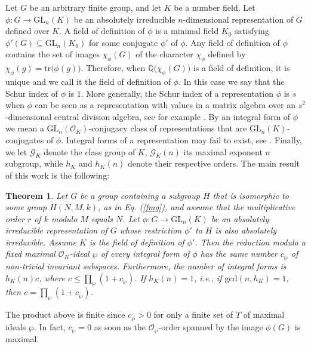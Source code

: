 \documentclass{article}
\newtheorem{theo}{Theorem}
\theoremstyle{definition}
\begin{document}
Let $G$ be an arbitrary finite group, and let $K$
be a number field. Let
$\phi:G\rightarrow\mathrm{GL}_n(K)$ be an absolutely
irreducible $n$-dimensional representation of $G$
defined over $K$. A field of definition of $\phi$ is a minimal
field $K_0$ satisfying $\phi'(G)\subseteq\mathrm{GL}_n(K_0)$ for some
conjugate $\phi'$ of $\phi$. Any field of definition of $\phi$ contains
the set of images $\chi_\phi(G)$ of the character $\chi_\phi$ defined by
$\chi_\phi(g)=\mathrm{tr}\big(\phi(g)\big)$. Therefore, when 
$\mathbb{Q}\big(\chi_\phi(G)\big)$ is a field of definition, it is unique
and we call it the field of definition of $\phi$. In this case we say that
the Schur index of $\phi$ is $1$. More generally, the Schur index of a 
representation $\phi$ is $s$ when $\phi$ can be seen as a representation with 
values in a matrix algebra over an $s^2$-dimensional central division algebra,
see for example \cite[\S2.4]{GS17}.
By an integral form of $\phi$
we mean a $\mathrm{GL}_n(\mathcal{O}_K)$-conjugacy
class of representations that are $\mathrm{GL}_n(K)$-conjugates of $\phi$. 
Integral forms of a representation may fail to exist, see \cite{Se08}.
Finally, we let $\mathcal{G}_K$ denote the class group of $K$,
$\mathcal{G}_K(n)$ its maximal exponent $n$ subgroup, while
$h_K$ and $h_K(n)$ denote their respective orders.
The main result of this work
is the following:

\begin{theo}\label{t0}
    Let $G$ be a group containing a subgroup $H$ that
    is isomorphic to some group $H(N,M,k)$, as in Eq. (\ref{fmg}),
    and assume that the multiplicative order $r$ of $k$ modulo 
    $M$ equals $N$. Let $\phi:G\rightarrow\mathrm{GL}_n(K)$ be an
    absolutely irreducible representation of $G$
    whose restriction $\phi'$ to $H$ is 
    also absolutely
    irreducible. Assume $K$ is the field of
    definition of $\phi'$. Then the reduction modulo a fixed maximal 
    $\mathcal{O}_K$-ideal $\wp$ of every integral form of $\phi$ 
    has the same number $c_\wp$ of non-trivial invariant subspaces.
    Furthermore, the number of integral forms is 
    $h_K(n)c$, where $c\leq \prod_\wp(1+c_\wp)$.
    If $h_K(n)=1$, i.e., if $\mathrm{gcd}(n,h_K)=1$,
    then $c=\prod_\wp(1+c_\wp)$.
\end{theo}

The product above is finite since $c_\wp>0$ for only a finite set of $T$ of
maximal ideals $\wp$. In fact, $c_\wp=0$ as soon as the $\mathcal{O}_\wp$-order 
spanned by the image $\phi(G)$ is maximal. 
\end{document}
